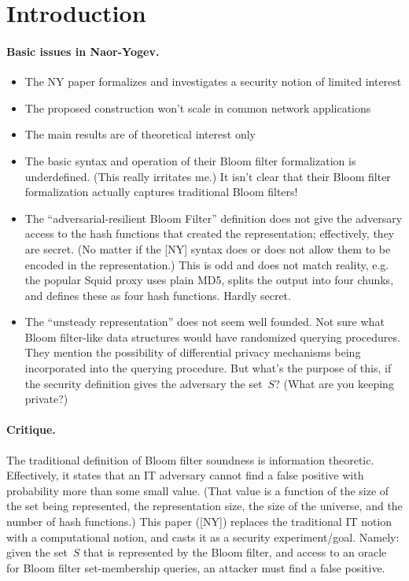 \section{Introduction}
\paragraph{Basic issues in Naor-Yogev. }
\begin{itemize}
\item The NY paper formalizes and investigates a security notion of limited interest
\item The proposed construction won't scale in common network applications
\item The main results are of theoretical interest only
\item The basic syntax and operation of their Bloom filter formalization is underdefined.  (This really irritates me.)  It isn’t clear that their Bloom filter formalization actually captures traditional Bloom filters! 
\item The ``adversarial-resilient Bloom Filter'' definition does not give the adversary access to the hash functions that created the representation; effectively, they are secret. (No matter if the [NY] syntax does or does not allow them to be encoded in the representation.)  This is odd and does not match reality, e.g. the popular Squid proxy uses plain MD5, splits the output into four chunks, and defines these as four hash functions.  Hardly secret.
\item The ``unsteady representation'' does not seem well founded.  Not sure what Bloom filter-like data structures would have randomized querying procedures.  They mention the possibility of differential privacy mechanisms being incorporated into the querying procedure.  But what's the purpose of this, if the security definition gives the adversary the set~$S$?  (What are you keeping private?) 
\end{itemize}

\paragraph{Critique. }
The traditional definition of Bloom filter soundness is information theoretic.  Effectively, it states that an IT adversary cannot find a false positive with probability more than some small value.  (That value is a function of the size of the set being represented, the representation size, the size of the universe, and the number of hash functions.)  This paper ([NY]) replaces the traditional IT notion with a computational notion, and casts it as a security experiment/goal.  Namely: given the set~$S$ that is represented by the Bloom filter, and access to an oracle for Bloom filter set-membership queries, an attacker must find a false positive.  

